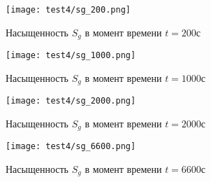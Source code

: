 \begin{figure}
  \begin{center}
    \begin{minipage}[h]{0.49\textwidth}
       \texttt{[image: test4/sg\_200.png]}
       \vspace{1cm}
       \caption{Насыщенность $S_g$ в момент времени $t=200$с}
    \end{minipage}
    \hfill
    \begin{minipage}[h]{0.49\textwidth}
       \texttt{[image: test4/sg\_1000.png]}
       \vspace{1cm}
       \caption{Насыщенность $S_g$ в момент времени $t=1000$с}
    \end{minipage}
    \vspace{3cm}
    \vfill
    \begin{minipage}[h]{0.49\textwidth}
       \texttt{[image: test4/sg\_2000.png]}
       \vspace{1cm}
       \caption{Насыщенность $S_g$ в момент времени $t=2000$с}
    \end{minipage}
    \hfill
    \begin{minipage}[h]{0.49\textwidth}
       \texttt{[image: test4/sg\_6600.png]}
       \vspace{1cm}
       \caption{Насыщенность $S_g$ в момент времени $t=6600$с}
    \end{minipage}
    \hfill  
  \end{center}
\end{figure}







